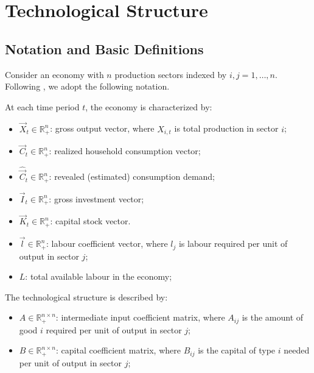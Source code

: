 \section{Technological Structure}
\label{sec:model}

\subsection{Notation and Basic Definitions}

Consider an economy with $n$ production sectors indexed by
$i,j = 1,\ldots,n$.
Following \citet{leontief1986input}, we adopt the following notation.

\begin{definition}
At each time period $t$, the economy is characterized by:
\begin{itemize}
    \item $\vec{X}_t \in \mathbb{R}^n_+$: gross output vector, where
          $X_{i,t}$ is total production in sector $i$;
    \item $\vec{C}_t \in \mathbb{R}^n_+$: realized household
          consumption vector;
    \item $\hat{\vec{C}}_t \in \mathbb{R}^n_+$: revealed (estimated)
          consumption demand;
    \item $\vec{I}_t \in \mathbb{R}^n_+$: gross investment vector;
    \item $\vec{K}_t \in \mathbb{R}^n_+$: capital stock vector.
    \item $\vec{l} \in \mathbb{R}^n_+$: labour coefficient vector,
          where $l_j$ is labour required per unit of output in sector
          $j$;
    \item $L$: total available labour in the economy;
\end{itemize}
\end{definition}

\begin{definition}
The technological structure is described by:
\begin{itemize}
    \item $A \in \mathbb{R}^{n \times n}_+$: intermediate input
          coefficient matrix, where $A_{ij}$ is the amount of good $i$
          required per unit of output in sector $j$;
    \item $B \in \mathbb{R}^{n \times n}_+$: capital coefficient
          matrix, where $B_{ij}$ is the capital of type $i$ needed per
          unit of output in sector $j$;
    
    \end{itemize}
\end{definition}

